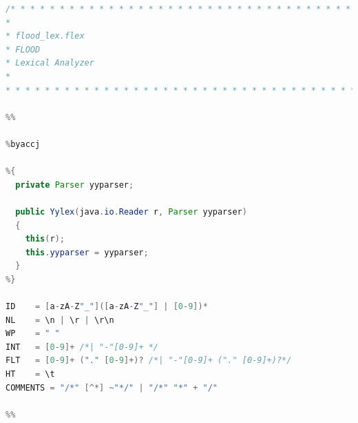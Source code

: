 \documentclass[12pt]{report}
\begin{document}
\begin{singlespace}
\begin{lstlisting}[language=Java,label=some-code,caption={flood$\_$lex.flex}]
/* * * * * * * * * * * * * * * * * * * * * * * * * * * * * * * * * * * * *
*
* flood_lex.flex
* FLOOD
* Lexical Analyzer
*
* * * * * * * * * * * * * * * * * * * * * * * * * * * * * * * * * * * * */

%%

%byaccj

%{
  private Parser yyparser;

  public Yylex(java.io.Reader r, Parser yyparser)
  {
    this(r);
    this.yyparser = yyparser;
  }
%}

ID    = [a-zA-Z"_"]([a-zA-Z"_"] | [0-9])*
NL    = \n | \r | \r\n
WP    = " "
INT   = [0-9]+ /*| "-"[0-9]+ */
FLT   = [0-9]+ ("." [0-9]+)? /*| "-"[0-9]+ ("." [0-9]+)?*/
HT    = \t
COMMENTS = "/*" [^*] ~"*/" | "/*" "*" + "/"

%%


\end{lstlisting}
\end{singlespace}
\end{document}
